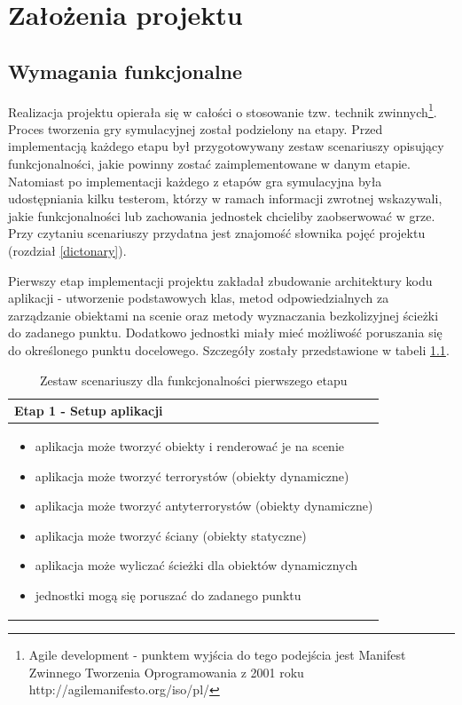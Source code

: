 \chapter{Założenia projektu}
\section{Wymagania funkcjonalne}
Realizacja projektu opierała się w całości o stosowanie tzw. technik zwinnych\footnote{Agile development - punktem wyjścia do tego podejścia jest Manifest Zwinnego Tworzenia Oprogramowania z 2001 roku http://agilemanifesto.org/iso/pl/}. Proces tworzenia gry symulacyjnej został podzielony na etapy. Przed implementacją każdego etapu był przygotowywany zestaw scenariuszy opisujący funkcjonalności, jakie powinny zostać zaimplementowane w danym etapie. Natomiast po implementacji każdego z etapów gra symulacyjna była udostępniania kilku testerom, którzy w ramach informacji zwrotnej wskazywali, jakie funkcjonalności lub zachowania jednostek chcieliby zaobserwować w grze. Przy czytaniu scenariuszy przydatna jest znajomość słownika pojęć projektu (rozdział \ref{dictonary}).

Pierwszy etap implementacji projektu zakładał zbudowanie architektury kodu aplikacji - utworzenie podstawowych klas, metod odpowiedzialnych za zarządzanie obiektami na scenie oraz metody wyznaczania bezkolizyjnej ścieżki do zadanego punktu. Dodatkowo jednostki miały mieć możliwość poruszania się do określonego punktu docelowego. Szczegóły zostały przedstawione w tabeli \ref{scenarios1}.

\begin{table}
\begin{center}
\begin{tabular}{|p{}|}
\hline
Etap 1 - Setup aplikacji\\\hline
	\begin{itemize}
		\setlength\itemsep{0pt}
		\item aplikacja może tworzyć obiekty i renderować je na scenie
		\item aplikacja może tworzyć terrorystów (obiekty dynamiczne)
		\item aplikacja może tworzyć antyterrorystów (obiekty dynamiczne)
		\item aplikacja może tworzyć ściany (obiekty statyczne)
		\item aplikacja może wyliczać ścieżki dla obiektów dynamicznych
		\item jednostki mogą się poruszać do zadanego punktu	
	\end{itemize}
\\\hline
\end{tabular}
\caption {Zestaw scenariuszy dla funkcjonalności pierwszego etapu\label{scenarios1}}
\end{center}
\end{table} 

